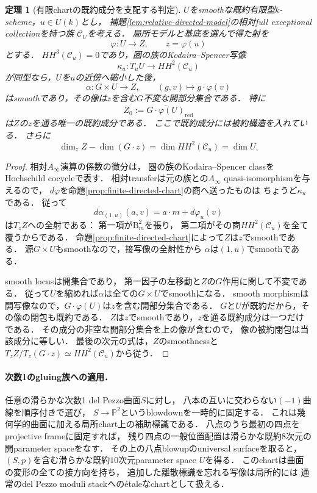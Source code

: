 \documentclass[11pt,a4paper]{ltjsarticle}
\newtheorem{theorem}{定理}[section]
\theoremstyle{definition}
\begin{document}
\begin{theorem}[有限chartの既約成分を支配する判定]
\label{thm:finite-chart-component}
$U$をsmoothな既約有限型$k$-scheme，$u\in U(k)$とし，
補題\ref{lem:relative-directed-model}の相対full exceptional collectionを持つ族
$\mathcal C_U$を考える．
局所モデルと基底を選んで得た射を
\[
 \varphi:U\longrightarrow Z,\qquad z=\varphi(u)
\]
とする．
$HH^3(\mathcal C_u)=0$であり，圏の族のKodaira--Spencer写像
\[
 \kappa_u:T_uU\longrightarrow HH^2(\mathcal C_u)
\]
が同型なら，$U$を$u$の近傍へ縮小した後，
\[
 \alpha:G\times U\longrightarrow Z,\qquad
             (g,v)\longmapsto g\cdot\varphi(v)
\]
はsmoothであり，その像は$z$を含む$G$不変な開部分集合である．
特に
\[
 Z_0:=\overline{G\cdot\varphi(U)}_{\mathrm{red}}
\]
は$Z$の$z$を通る唯一の既約成分である．
ここで既約成分には被約構造を入れている．
さらに
\[
 \dim_z Z-\dim(G\cdot z)
       =\dim HH^2(\mathcal C_u)=\dim U.
\]
\end{theorem}

\begin{proof}
相対$A_\infty$演算の係数の微分は，
圏の族のKodaira--Spencer classをHochschild cocycleで表す．
相対transferは元の族との$A_\infty$ quasi-isomorphismを与えるので，
$d\varphi$を命題\ref{prop:finite-directed-chart}の商へ送ったものは
ちょうど$\kappa_u$である．
従って
\[
 d\alpha_{(1,u)}(a,v)=a\cdot m+d\varphi_u(v)
\]
は$T_zZ$への全射である：
第一項が$\mathrm B_m^2$を張り，
第二項がその商$HH^2(\mathcal C_u)$を全て覆うからである．
命題\ref{prop:finite-directed-chart}によって$Z$は$z$でsmoothである．
源$G\times U$もsmoothなので，接写像の全射性から
$\alpha$は$(1,u)$でsmoothである．

smooth locusは開集合であり，
第一因子の左移動と$Z$の$G$作用に関して不変である．
従って$U$を縮めれば$\alpha$は全ての$G\times U$でsmoothになる．
smooth morphismは開写像なので，$G\cdot\varphi(U)$は$z$を含む開部分集合である．
$G$と$U$が既約だから，その像の閉包も既約である．
$Z$は$z$でsmoothであり，$z$を通る既約成分は一つだけである．
その成分の非空な開部分集合を上の像が含むので，
像の被約閉包は当該成分に等しい．
最後の次元の式は，$Z$のsmoothnessと
$T_zZ/T_z(G\cdot z)\simeq HH^2(\mathcal C_u)$から従う．
\end{proof}

\paragraph{次数1のgluing族への適用．}
任意の滑らかな次数1 del Pezzo曲面$S$に対し，
八本の互いに交わらない$(-1)$曲線を順序付きで選び，
$S\to\mathbb P^2$というblowdownを一時的に固定する．
これは幾何学的曲面に加える局所chart上の補助標識である．
八点のうち最初の四点をprojective frameに固定すれば，
残り四点の一般位置配置は滑らかな既約$8$次元の開parameter spaceをなす．
その上の八点blowupのuniversal surfaceを取ると，
$(S,p)$を含む滑らかな既約$10$次元parameter space $U$を得る．
このchartは曲面の変形の全ての接方向を持ち，
追加した離散標識を忘れる写像は局所的には
通常のdel Pezzo moduli stackへの\'etaleなchartとして扱える．
\end{document}
